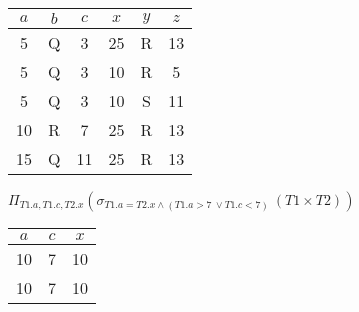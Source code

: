 \begin{problem}
\begin{enumalph}
\begin{Answer}
      \centering
      \begin{tabular}{|c|c|c|c|c|c|}
        \hline
        $a$ & $b$ & $c$ & $x$ & $y$ & $z$ \\
        \hline
        5 & Q & 3 & 25 & R & 13 \\
        \hline
        5 & Q & 3 & 10 & R & 5 \\
        \hline
        5 & Q & 3 & 10 & S & 11 \\
        \hline
        10 & R & 7 & 25 & R & 13 \\
        \hline
        15 & Q & 11 & 25 & R & 13 \\
        \hline
      \end{tabular}
    \end{Answer}
    \item $\Pi_{T1.a, T1.c, T2.x}(\sigma_{T1.a = T2.x \land (T1.a > 7\ \lor T1.c < 7)}\ (T1 \times T2))$
  
    \begin{Answer}
      \centering
      \begin{tabular}{|c|c|c|}
        \hline
        $a$ & $c$ & $x$ \\
        \hline
        10 & 7 & 10 \\
        \hline
        10 & 7 & 10 \\
        \hline
      \end{tabular}
    \end{Answer}
  \end{enumalph}
  
\end{problem}


